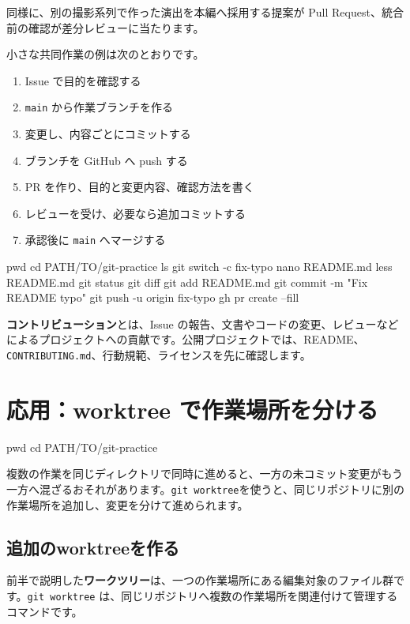 \documentclass[a4paper,11pt]{jlreq}
\newcommand{\cmd}[1]{\texttt{#1}}
\newcommand{\term}[1]{\textbf{#1}}
\begin{document}
同様に、別の撮影系列で作った演出を本編へ採用する提案が Pull Request、統合前の確認が差分レビューに当たります。

小さな共同作業の例は次のとおりです。

\begin{enumerate}
  \item Issue で目的を確認する
  \item \cmd{main} から作業ブランチを作る
  \item 変更し、内容ごとにコミットする
  \item ブランチを GitHub へ push する
  \item PR を作り、目的と変更内容、確認方法を書く
  \item レビューを受け、必要なら追加コミットする
  \item 承認後に \cmd{main} へマージする
\end{enumerate}

\begin{codeblock}
pwd
cd PATH/TO/git-practice
ls
git switch -c fix-typo
nano README.md
less README.md
git status
git diff
git add README.md
git commit -m "Fix README typo"
git push -u origin fix-typo
gh pr create --fill
\end{codeblock}

\term{コントリビューション}とは、Issue の報告、文書やコードの変更、レビューなどによるプロジェクトへの貢献です。公開プロジェクトでは、README、\cmd{CONTRIBUTING.md}、行動規範、ライセンスを先に確認します。

\section{応用：worktree で作業場所を分ける}

\begin{codeblock}
pwd
cd PATH/TO/git-practice
\end{codeblock}

複数の作業を同じディレクトリで同時に進めると、一方の未コミット変更がもう一方へ混ざるおそれがあります。\cmd{git worktree}を使うと、同じリポジトリに別の作業場所を追加し、変更を分けて進められます。

\subsection{追加のworktreeを作る}

前半で説明した\term{ワークツリー}は、一つの作業場所にある編集対象のファイル群です。\cmd{git worktree} は、同じリポジトリへ複数の作業場所を関連付けて管理するコマンドです。
\end{document}
